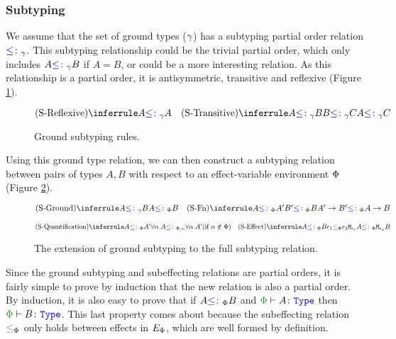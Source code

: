 \subsubsection{Subtyping}

We assume that the set of ground types ($\g$) has a subtyping partial order relation $\subtype_{\ground}$. This subtyping relationship could be the trivial partial order, which only includes $A\subtypeg B$ if $A = B$, or could be a more interesting relation. As this relationship is a partial order, it is antisymmetric, transitive and reflexive (Figure \ref{GroundSubtyping}).

\begin{figure}[H]
    \centering
\begin{framed}
    \[
        \ntreerulez{\sreflexive}{A \subtype_{\ground} A}
        \quad
        \ntreeruleII{\stransitive}{A \subtype_{\ground} B}{B \subtype_{\ground} C}{A \subtype_{\ground} C}
    \]
\end{framed}
    \caption{Ground subtyping rules.}
    \label{GroundSubtyping}
\end{figure}
    

Using this ground type relation, we can then construct a subtyping relation between pairs of types $A, B$ with respect to an effect-variable environment $\P$ (Figure \ref{FullSubtypingDefinition}).

\begin{figure}[H]
    \centering

    \begin{framed}
    
\[
    \scalebox{0.85}{$
    \ntreeruleI{\sground}{A \subtype_{\ground} B}{A \subtypep B}
    \quad
    \ntreeruleII{\sfun}{A \subtypep A'}{B' \subtypep B }{\fntype{A'}{B'} \subtypep \ab}
    $}
    \]
    
    \[\scalebox{0.85}{$
    \condtreeruleI{\squant}{A\subtypep A'}{\all{\a}{A}\subtypepa\all{\a}{A'}}{\a\notin\P}
    \quad
    \ntreeruleII{\seffect}{A\subtypep B}{ \e_1\subeffectp\e_2}{\M{\e_1}{A}\subtypep\M{\e_2}{B}}
    $}
\]      
    \end{framed}
  

    \caption{The extension of ground subtyping to the full subtyping relation.}
    \label{FullSubtypingDefinition}
\end{figure}

Since the ground subtyping and subeffecting relations are partial orders, it is fairly simple to prove by induction that the new relation is also a partial order. By induction, it is also easy to prove that if $A \subtypep B$ and $\wellformedtype{\P}{A}$ then $\wellformedtype{\P}{B}$. This last property comes about because the subeffecting relation $\subeffectp$ only holds between effects in $E_\P$, which are well formed by definition.


